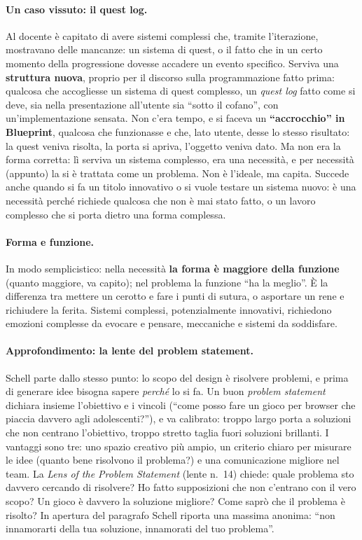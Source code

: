 \paragraph{Un caso vissuto: il quest log.} Al docente è capitato di avere
sistemi complessi che, tramite l'iterazione, mostravano delle mancanze: un
sistema di quest, o il fatto che in un certo momento della progressione
dovesse accadere un evento specifico. Serviva una \textbf{struttura nuova},
proprio per il discorso sulla programmazione fatto prima: qualcosa che
accogliesse un sistema di quest complesso, un \emph{quest log} fatto come si
deve, sia nella presentazione all'utente sia ``sotto il cofano'', con
un'implementazione sensata. Non c'era tempo, e si faceva un
\textbf{``accrocchio'' in Blueprint}, qualcosa che funzionasse e che, lato
utente, desse lo stesso risultato: la quest veniva risolta, la porta si
apriva, l'oggetto veniva dato. Ma non era la forma corretta: lì serviva un
sistema complesso, era una necessità, e per necessità (appunto) la si è
trattata come un problema. Non è l'ideale, ma capita. Succede anche quando si
fa un titolo innovativo o si vuole testare un sistema nuovo: è una necessità
perché richiede qualcosa che non è mai stato fatto, o un lavoro complesso che
si porta dietro una forma complessa.

\paragraph{Forma e funzione.} In modo semplicistico: nella necessità
\textbf{la forma è maggiore della funzione} (quanto maggiore, va capito); nel
problema la funzione ``ha la meglio''. È la differenza tra mettere un cerotto
e fare i punti di sutura, o asportare un rene e richiudere la ferita. Sistemi
complessi, potenzialmente innovativi, richiedono emozioni complesse da
evocare e pensare, meccaniche e sistemi da soddisfare.

\paragraph{Approfondimento: la lente del problem statement.} Schell parte
dallo stesso punto: lo scopo del design è risolvere problemi, e prima di
generare idee bisogna sapere \emph{perché} lo si fa. Un buon \emph{problem
statement} dichiara insieme l'obiettivo e i vincoli (``come posso fare un
gioco per browser che piaccia davvero agli adolescenti?''), e va calibrato:
troppo largo porta a soluzioni che non centrano l'obiettivo, troppo stretto
taglia fuori soluzioni brillanti. I vantaggi sono tre: uno spazio creativo più
ampio, un criterio chiaro per misurare le idee (quanto bene risolvono il
problema?) e una comunicazione migliore nel team. La \emph{Lens of the Problem
Statement} (lente n.~14) chiede: quale problema sto davvero cercando di
risolvere? Ho fatto supposizioni che non c'entrano con il vero scopo? Un gioco
è davvero la soluzione migliore? Come saprò che il problema è risolto? In apertura
del paragrafo Schell riporta una massima anonima: ``non innamorarti della tua
soluzione, innamorati del tuo problema''.

